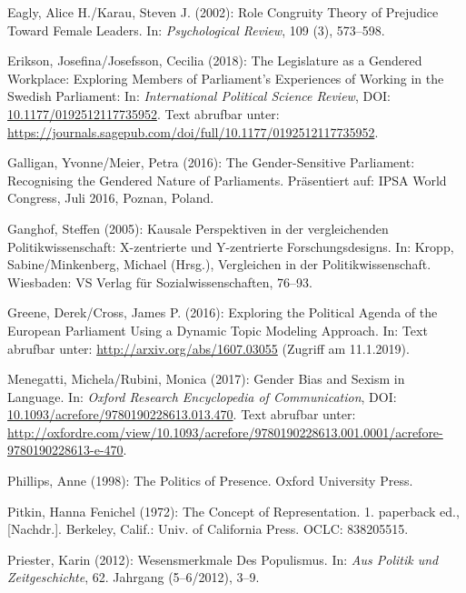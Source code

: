 \documentclass[12pt,ngerman,]{article}
\begin{document}
\leavevmode\hypertarget{ref-eagly_2002}{}%
Eagly, Alice H./Karau, Steven J. (2002): Role Congruity Theory of
Prejudice Toward Female Leaders. In: \emph{Psychological Review}, 109
(3), 573--598.

\leavevmode\hypertarget{ref-erikson_2018}{}%
Erikson, Josefina/Josefsson, Cecilia (2018): The Legislature as a
Gendered Workplace: Exploring Members of Parliament's Experiences of
Working in the Swedish Parliament: In: \emph{International Political
Science Review}, DOI:
\href{https://doi.org/10.1177/0192512117735952}{10.1177/0192512117735952}.
Text abrufbar unter:
\url{https://journals.sagepub.com/doi/full/10.1177/0192512117735952}.

\leavevmode\hypertarget{ref-galligan_2016}{}%
Galligan, Yvonne/Meier, Petra (2016): The Gender-Sensitive Parliament:
Recognising the Gendered Nature of Parliaments. Präsentiert auf: IPSA
World Congress, Juli 2016, Poznan, Poland.

\leavevmode\hypertarget{ref-ganghof_2005}{}%
Ganghof, Steffen (2005): Kausale Perspektiven in der vergleichenden
Politikwissenschaft: X-zentrierte und Y-zentrierte Forschungsdesigns.
In: Kropp, Sabine/Minkenberg, Michael (Hrsg.), Vergleichen in der
Politikwissenschaft. Wiesbaden: VS Verlag für Sozialwissenschaften,
76--93.

\leavevmode\hypertarget{ref-greene_2016}{}%
Greene, Derek/Cross, James P. (2016): Exploring the Political Agenda of
the European Parliament Using a Dynamic Topic Modeling Approach. In:
Text abrufbar unter: \url{http://arxiv.org/abs/1607.03055} (Zugriff am
11.1.2019).

\leavevmode\hypertarget{ref-menegatti_2017}{}%
Menegatti, Michela/Rubini, Monica (2017): Gender Bias and Sexism in
Language. In: \emph{Oxford Research Encyclopedia of Communication}, DOI:
\href{https://doi.org/10.1093/acrefore/9780190228613.013.470}{10.1093/acrefore/9780190228613.013.470}.
Text abrufbar unter:
\url{http://oxfordre.com/view/10.1093/acrefore/9780190228613.001.0001/acrefore-9780190228613-e-470}.

\leavevmode\hypertarget{ref-phillips_1998}{}%
Phillips, Anne (1998): The Politics of Presence. Oxford University
Press.

\leavevmode\hypertarget{ref-pitkin_1972}{}%
Pitkin, Hanna Fenichel (1972): The Concept of Representation. 1.
paperback ed., {[}Nachdr.{]}. Berkeley, Calif.: Univ. of California
Press. OCLC: 838205515.

\leavevmode\hypertarget{ref-priester_2012}{}%
Priester, Karin (2012): Wesensmerkmale Des Populismus. In: \emph{Aus
Politik und Zeitgeschichte}, 62. Jahrgang (5--6/2012), 3--9.
\end{document}
